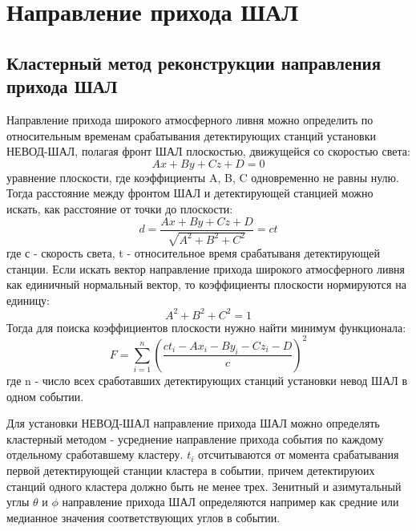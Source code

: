 \chapter*{Направление прихода ШАЛ}
\label{ch:intro}

\section*{Кластерный метод реконструкции направления прихода ШАЛ}
\label{sec:methods}


Направление прихода широкого атмосферного ливня \cite{shulzhenko2019} можно определить по относительным временам срабатывания детектирующих станций установки НЕВОД-ШАЛ, полагая фронт ШАЛ плоскостью, движущейся со скоростью света:
\begin{equation}
Ax+By+Cz+D=0
\end{equation}
уравнение плоскости, где коэффициенты A, B, C  одновременно не равны нулю.
Тогда расстояние между фронтом ШАЛ и детектирующей станцией можно искать, как
расстояние от точки до плоскости:
\begin{equation}
d = \frac{Ax+By+Cz+D}{\sqrt{A^2 + B^2 + C^2}} = ct
\end{equation}
где с - скорость света, t - относительное время срабатываня детектирующей станции.
Если искать вектор направление прихода широкого атмосферного ливня как единичный нормальный вектор, то коэффициенты плоскости нормируются на единицу:
\begin{equation}
A^2 + B^2 + C^2 = 1
\end{equation}
Тогда для поиска коэффициентов плоскости нужно найти минимум функционала:
\begin{equation}
F = \sum_{i=1}^{n} \left(\frac{ct_i - Ax_i - By_i - Cz_i - D}{c} \right)^2
\end{equation}
где n - число всех сработавших детектирующих станций установки невод ШАЛ в одном событии.

Для установки НЕВОД-ШАЛ направление прихода ШАЛ можно определять кластерный методом - усреднение направление прихода события по каждому отдельному сработавшему кластеру. \(t_i\) отсчитываются от момента срабатывания первой детектирующей станции кластера в событии, причем детектируюих станций одного кластера должно быть не менее трех. Зенитный и азимутальный углы \(\theta\) и \(\phi\) направление прихода ШАЛ определяются например как средние или медианное значения соответствующих углов в событии.


